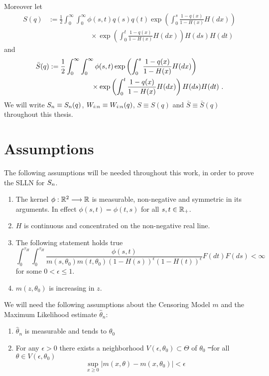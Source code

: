 Moreover let
\begin{align*}
S(q) &:= \frac{1}{2}\int_{0}^{\infty} \int_{0}^{\infty} \phi(s,t) q(s)q(t) \exp\left(\int_{0}^{s} \frac{1-q(x)}{1-H(x)} H(dx)\right)\\
&\qquad\qquad\qquad \times \exp\left(\int_{0}^{t} \frac{1-q(x)}{1-H(x)} H(dx) \right)H(ds)H(dt)
\end{align*}
and 
\begin{align*}
\bar{S}(q) &:= \frac{1}{2}\int_{0}^{\infty} \int_{0}^{\infty} \phi(s,t)  \exp\left(\int_{0}^{s} \frac{1-q(x)}{1-H(x)} H(dx)\right)\\
&\qquad\qquad\qquad \times \exp\left(\int_{0}^{t} \frac{1-q(x)}{1-H(x)} H(dx) \right)H(ds)H(dt)\textrm{ .}
\end{align*}
We will write $S_{n} \equiv S_{n}(q)$, $W_{i:n} \equiv W_{i:n}(q)$, $S\equiv S(q)$ and $\bar S\equiv \bar S(q)$ throughout this thesis.
%
\section{Assumptions}
The following assumptions will be needed throughout this work, in order to prove the SLLN for $S_{n}$.
\begin{enumerate}[({A}1)]
	\item \label{ass:kernel_gen} The kernel $\phi: \mathbb{R}^2 \longrightarrow \mathbb{R}$ is measurable, non-negative and symmetric in its arguments. In effect $\phi(s,t) = \phi(t,s)$ for all $s,t \in \mathbb{R}_+$. 
	\item \label{ass:H_nonneg} $H$ is continuous and concentrated on the non-negative real line.
	\item \label{ass:intgral_phi_q} The following statement holds true
	$$\int_{0}^{\tau_H} \int_{0}^{\tau_H} \frac{\phi(s,t)}{m(s, \theta_0)m(t,\theta_0)(1-H(s))^\epsilon(1-H(t))^{\epsilon}} F(dt)F(ds) < \infty$$
	for some $0<\epsilon\leq 1$.
	\item \label{ass:m_increas} $m(z,\theta_0)$ is increasing in $z$.
\end{enumerate}
%
\vspace{1cm}
We will need the following assumptions about the Censoring Model $m$ and the Maximum Likelihood estimate $\hat\theta_n$:
\begin{enumerate}[({M}1)]
	\item \label{ass:m_consistency} $\hat{\theta}_n$ is measurable and tends to $\theta_0$
	\item \label{ass:m_nbhd} For any $\epsilon>0$ there exists a neighborhood $V(\epsilon, \theta_0)\subset \Theta$ of $\theta_0$ \st\ for all $\theta\in V(\epsilon, \theta_0)$ 
	$$\sup\limits_{x\geq 0} |m(x, \theta) - m(x, \theta_0)| < \epsilon$$
\end{enumerate}
